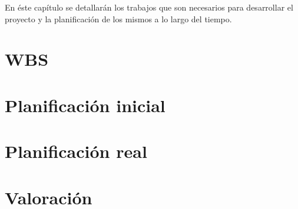 En éste capítulo se detallarán los trabajos que son necesarios para desarrollar el proyecto y la planificación de los mismos a lo largo del tiempo.

\section{WBS}
\label{planificacion:wbs}


\section{Planificación inicial}
\label{planificacion:inicial}


\section{Planificación real}
\label{planificacion:real}


\section{Valoración}
\label{planificacion:valoracion}
